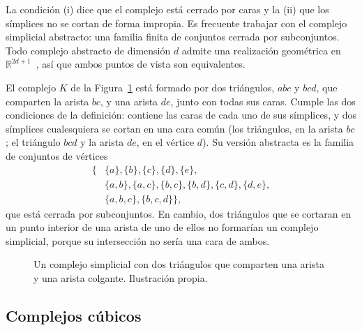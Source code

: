 La condición (i) dice que el complejo está cerrado por caras y la (ii) que
los símplices no se cortan de forma impropia. Es frecuente trabajar con el complejo simplicial abstracto: una familia finita de conjuntos cerrada por
subconjuntos. Todo complejo abstracto de dimensión $d$ admite una
realización geométrica en $\mathbb{R}^{2d+1}$~\cite[§III.1]{edelsbrunner2010},
así que ambos puntos de vista son equivalentes.

\begin{ejemplo}
El complejo $K$ de la Figura~\ref{fig:complejo} está formado por dos
triángulos, $abc$ y $bcd$, que comparten la arista $bc$, y una arista
$de$, junto con todas sus caras. Cumple las dos condiciones de la
definición: contiene las caras de cada uno de sus símplices, y dos
símplices cualesquiera se cortan en una cara común (los triángulos, en la
arista $bc$; el triángulo $bcd$ y la arista $de$, en el vértice $d$). Su
versión abstracta es la familia de conjuntos de vértices
\[
  \begin{aligned}
  \bigl\{&\{a\},\{b\},\{c\},\{d\},\{e\},\\
         &\{a,b\},\{a,c\},\{b,c\},\{b,d\},\{c,d\},\{d,e\},\\
         &\{a,b,c\},\{b,c,d\}\bigr\},
  \end{aligned}
\]
que está cerrada por subconjuntos. En cambio, dos triángulos que se
cortaran en un punto interior de una arista de uno de ellos no formarían
un complejo simplicial, porque su intersección no sería una cara de
ambos.
\end{ejemplo}

\begin{figure}[ht]
\centering
{}
\caption{Un complejo simplicial con dos triángulos que comparten una
arista y una arista colgante. Ilustración propia.}
\label{fig:complejo}
\end{figure}

\subsection{Complejos cúbicos}

